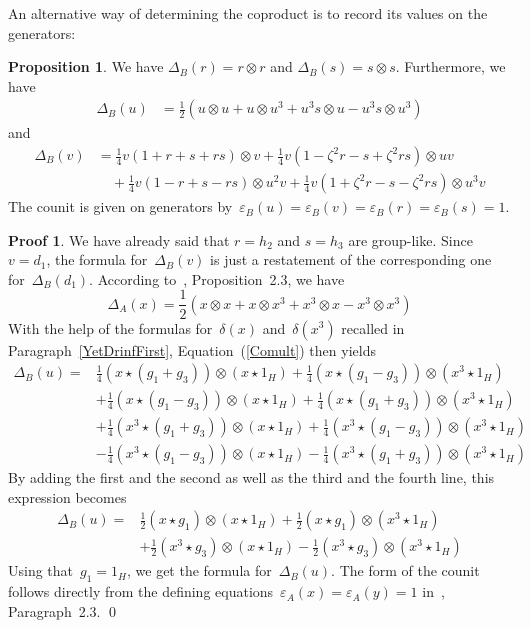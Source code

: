 \documentclass{article}
\numberwithin{equation}{section}
\theoremstyle{definition}
\newtheorem*{prop}{Proposition}
\newtheorem*{pf}{Proof}
\theoremstyle{break}
\newcommand{\ot}{\mathbin{\otimes}}
\newcommand{\K}{1}
\newcommand{\1}{{(1)}}
\newcommand{\2}{{(2)}}
\newcommand{\3}{{(3)}}
\newcommand{\da}{\Delta_{A}}
\newcommand{\db}{\Delta_{B}}
\newcommand{\ea}{{\varepsilon_{A}}}
\newcommand{\eb}{{\varepsilon_{B}}}
\newcommand{\HH}{1_H}
\begin{document}
An alternative way of determining the coproduct is to record its values on the generators:
\begin{prop}
We have $\db(r) = r \ot r$ and $\db(s) = s \ot s$. Furthermore, we have
\begin{align*}
\db(u) &= \frac{\K}{2} (u \ot u + u \ot u^3 +  u^3 s \ot u - u^3 s \ot u^3)
\end{align*}
and
\begin{align*}
\db(v) &= \frac{1}{4} v (1 + r + s + rs) \ot v
+ \frac{1}{4} v (1 - \zeta^2 r - s + \zeta^2 rs) \ot u v \\
&\quad + \frac{1}{4} v (1 - r + s - rs) \ot u^2 v
+ \frac{1}{4} v (1 + \zeta^2 r - s - \zeta^2 rs) \ot u^3 v
\end{align*}
The counit is given on generators by~$\eb(u) = \eb(v) = \eb(r) = \eb(s) = 1$.
\end{prop}
\begin{pf}
We have already said that $r=h_2$ and $s=h_3$ are group-like. Since $v=d_1$, the formula for~$\db(v)$ is just a restatement of the corresponding one for~$\db(d_1)$. According to~\cite{KaSo2}, Proposition~2.3, we have
\[\da(x) =  \frac{\K}{2} (x \ot x + x \ot x^3 + x^3 \ot x - x^3 \ot x^3)\]
With the help of the formulas for~$\delta(x)$ and~$\delta(x^3)$ recalled in Paragraph~\ref{YetDrinfFirst}, Equation~(\ref{Comult}) then yields
\begin{align*}
\db(u) = {} &
\frac{\K}{4} (x \star (g_1 + g_3)) \ot (x \star \HH)
+ \frac{\K}{4} (x \star (g_1 - g_3)) \ot (x^3 \star \HH)\\
&+ \frac{\K}{4} (x \star (g_1 - g_3)) \ot (x \star \HH)
+ \frac{\K}{4} (x \star (g_1 + g_3)) \ot (x^3 \star \HH)\\
&+ \frac{\K}{4} (x^3 \star (g_1 + g_3)) \ot (x \star \HH)
+ \frac{\K}{4} (x^3 \star (g_1 - g_3)) \ot (x^3 \star \HH)\\
&- \frac{\K}{4} (x^3 \star (g_1 - g_3)) \ot (x \star \HH)
- \frac{\K}{4} (x^3 \star (g_1 + g_3)) \ot (x^3 \star \HH)
\end{align*}
By adding the first and the second as well as the third and the fourth line, this expression becomes
\begin{align*}
\db(u) = {} &
\frac{\K}{2} (x \star g_1) \ot (x \star \HH)
+ \frac{\K}{2} (x \star g_1) \ot (x^3 \star \HH) \\
&+ \frac{\K}{2} (x^3 \star g_3) \ot (x \star \HH)
- \frac{\K}{2} (x^3 \star g_3) \ot (x^3 \star \HH)
\end{align*}
Using that~$g_1 = \HH$, we get the formula for~$\db(u)$. The form of the counit follows directly from the defining equations~$\ea(x) = \ea(y) = 1$ in~\cite{KaSo2}, Paragraph~2.3.
\qed
\end{pf}
\end{document}
